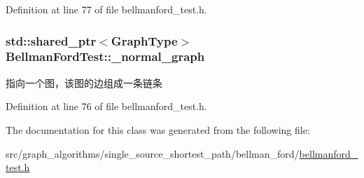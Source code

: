 Definition at line 77 of file bellmanford\+\_\+test.\+h.

\hypertarget{class_bellman_ford_test_a80eda504410ddbef790a30a0d4049185}{}
\subsubsection[{\+\_\+normal\+\_\+graph}]{\setlength{\rightskip}{0pt plus 5cm}std\+::shared\+\_\+ptr$<${\bf Graph\+Type}$>$ Bellman\+Ford\+Test\+::\+\_\+normal\+\_\+graph\hspace{0.3cm}{\ttfamily [protected]}}\label{class_bellman_ford_test_a80eda504410ddbef790a30a0d4049185}
指向一个图，该图的边组成一条链条 

Definition at line 76 of file bellmanford\+\_\+test.\+h.



The documentation for this class was generated from the following file\+:\begin{DoxyCompactItemize}
\item 
src/graph\+\_\+algorithms/single\+\_\+source\+\_\+shortest\+\_\+path/bellman\+\_\+ford/\hyperlink{bellmanford__test_8h}{bellmanford\+\_\+test.\+h}\end{DoxyCompactItemize}
